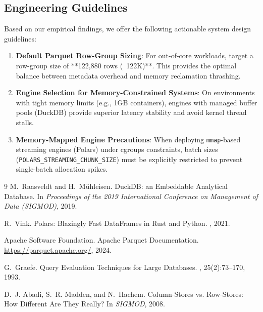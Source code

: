 \documentclass[sigconf,nonacm]{acmart}
\begin{document}
\subsection{Engineering Guidelines}
Based on our empirical findings, we offer the following actionable system design guidelines:
\begin{enumerate}
    \item \textbf{Default Parquet Row-Group Sizing}: For out-of-core workloads, target a row-group size of **122,880 rows (~122K)**. This provides the optimal balance between metadata overhead and memory reclamation thrashing.
    \item \textbf{Engine Selection for Memory-Constrained Systems}: On environments with tight memory limits (e.g., 1GB containers), engines with managed buffer pools (DuckDB) provide superior latency stability and avoid kernel thread stalls.
    \item \textbf{Memory-Mapped Engine Precautions}: When deploying \texttt{mmap}-based streaming engines (Polars) under cgroups constraints, batch sizes (\texttt{POLARS\_STREAMING\_CHUNK_SIZE}) must be explicitly restricted to prevent single-batch allocation spikes.
\end{enumerate}

\balance

\begin{thebibliography}{9}
M.~Raasveldt and H.~M{\"u}hleisen.
\newblock DuckDB: an Embeddable Analytical Database.
\newblock In {\em Proceedings of the 2019 International Conference on Management of Data (SIGMOD)}, 2019.

R.~Vink.
\newblock Polars: Blazingly Fast DataFrames in Rust and Python.
, 2021.

Apache Software Foundation.
\newblock Apache Parquet Documentation.
\newblock \url{https://parquet.apache.org/}, 2024.

G.~Graefe.
\newblock Query Evaluation Techniques for Large Databases.
, 25(2):73--170, 1993.

D.~J. Abadi, S.~R. Madden, and N.~Hachem.
\newblock Column-Stores vs. Row-Stores: How Different Are They Really?
\newblock In {\em SIGMOD}, 2008.
\end{thebibliography}
\end{document}
